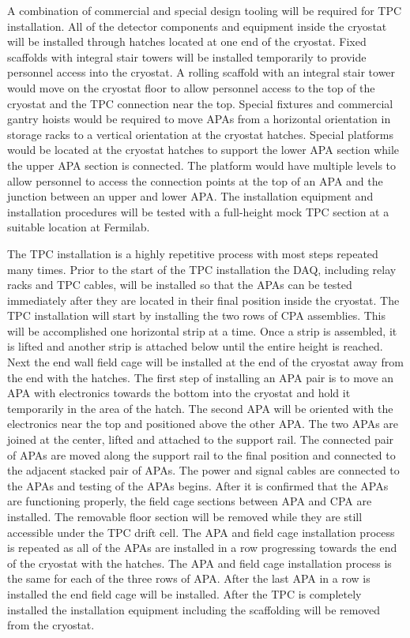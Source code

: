 A combination of commercial and special design tooling will be required for TPC installation. All of the 
detector components and equipment inside the cryostat will be installed through hatches located at one 
end of the cryostat.  Fixed scaffolds with integral stair towers will be installed temporarily to provide 
personnel access into the cryostat. A rolling scaffold with an integral stair tower would move on the 
cryostat floor to allow personnel access to the top of the cryostat and the TPC connection near the top. 
Special fixtures and commercial gantry hoists would be required to move APAs  from a horizontal 
orientation in storage racks to a vertical orientation at the cryostat hatches. Special platforms would be 
located at the cryostat hatches to support the lower APA section while the upper APA section is 
connected. The platform would have multiple levels to allow personnel to access the connection points 
at the top of an APA and the junction between an upper and lower APA. The installation equipment and 
installation procedures will be tested with a full-height mock TPC section at a suitable location at 
Fermilab. 

The TPC installation is a highly repetitive process with most steps repeated many times. Prior to the start 
of the TPC installation the DAQ, including relay racks and TPC cables, will be installed so that the APAs 
can be tested immediately after they are located in their final position inside the cryostat. The TPC 
installation will start by installing the two rows of CPA assemblies. This will be accomplished one 
horizontal strip at a time. Once a strip is assembled, it is lifted and another strip is attached below until 
the entire height is reached. Next the end wall field cage will be installed at the end of the cryostat away 
from the end with the hatches. The first step of installing an APA pair is to move an APA with electronics 
towards the bottom into the cryostat and hold it temporarily in the area of the hatch. The second APA will be oriented with the electronics near the top and positioned above the other APA. The two APAs are joined at the center, lifted and attached to the support rail. The connected pair of APAs are moved along the support rail to the 
final position and connected to the adjacent stacked pair of APAs.  The power and signal cables are connected 
to the APAs and testing of the APAs begins. After it is confirmed that the APAs are functioning properly, 
the field cage sections between APA and CPA are installed. The removable floor section will be removed 
while they are still accessible under the TPC drift cell.  The APA and field cage installation process is 
repeated as all of the APAs are installed in a row progressing towards the end of the cryostat with the 
hatches. The APA and field cage installation process is the same for each of the three rows of APA. After 
the last APA in a row is installed the end field cage will be installed. After the TPC is completely installed 
the installation equipment including the scaffolding will be removed from the cryostat.

